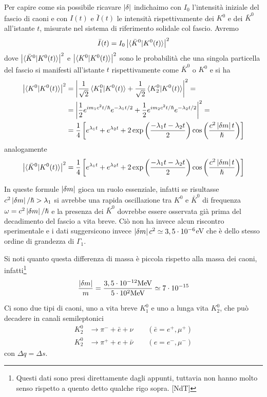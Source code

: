 Per capire come sia possibile ricavare $\left| \delta \right|$ indichaimo con $I_0$
l'intensità iniziale del fascio di caoni e con $I(t)$ e $\bar{I}(t)$ le
intensità rispettivamente dei $K^0$ e dei $\bar{K}^0$ all'istante $t$, misurate
nel sistema di riferimento solidale col fascio. Avremo
\[
  \bar{I}(t) = I_0\left| \braket{\bar{K}^0|K^0(t)} \right|^2
\]
dove $\left| \braket{\bar{K}^0|K^0(t)} \right|^2$ e $\left| \braket{K^0|K^0(t)} \right|^2
$ sono le probabilità che una singola particella del fascio si manifesti
all'istante $t$ rispettivamente come $\bar{K}^0$ o $K^0$ e si ha
\[
  \begin{split}
	\left| \braket{K^0|K^0(t)} \right|^2 &= \left| \frac{1}{\sqrt{2}}\braket{K_1^0|K^0(t)}
	+ \frac{1}{\sqrt{2}}\braket{K_2^0|K^0(t)} \right|^2=\\
	&= \left| \frac{1}{2}e^{im_1c^2t/\hslash}e^{-\lambda_1t/2} +
	\frac{1}{2}e^{im_2c^2t/\hslash}e^{-\lambda_2t/2} \right|^2=\\
    &=\frac{1}{4}\left[ e^{\lambda_1t} + e^{\lambda_2t} + 2\exp\left(
	  \frac{-\lambda_1t - \lambda_2t}{2}
	\right)\cos\left( \frac{c^2\left| \delta m \right|t}{\hslash} \right)\right]
  \end{split}
\]
analogamente
\[
  \left| \braket{\bar{K}^0|K^0(t)} \right|^2=\frac{1}{4}\left[ e^{\lambda_1t} + e^{\lambda_2t} + 2\exp\left(
  \frac{-\lambda_1t - \lambda_2t}{2}
  \right)\cos\left( \frac{c^2\left| \delta m \right|t}{\hslash} \right)\right]
\]

In queste formule $\left| \delta m \right|$ gioca un ruolo essenziale, infatti se
risultasse $c^2\left| \delta m \right|/\hslash > \lambda_1$ si avrebbe una rapida
oscillazione tra $K^0$ e $\bar{K}^0$ di frequenza $\omega = c^2\left| \delta
m \right|/\hslash$ e la presenza dei $\bar{K}^0$ dovrebbe essere osservata già prima
del decadimento del fascio a vita breve. Ciò non ha invece alcun riscontro
sperimentale e i dati suggersicono invece $\left| \delta m \right| c^2
\simeq3,5\cdot10^{-6}$eV che è dello stesso ordine di grandezza di $\Gamma_1$.

Si noti quanto questa differenza di massa è piccola rispetto alla massa dei
caoni, infatti\footnote{Questi dati sono presi direttamente dagli appunti,
  tuttavia non hanno molto senso rispetto a quento detto qualche rigo sopra.
[NdT]}
\[
  \frac{\left| \delta m \right|}{m} =
  \frac{3,5\cdot10^{-12}\text{MeV}}{5\cdot10^2\text{MeV}}\simeq
  7\cdot10^{-15}
\]

\breaknote

Ci sono due tipi di caoni, uno a vita breve $K_1^0$ e uno a lunga vita $K_2^0$,
che può decadere in canali semileptonici
\[
  \begin{split}
	K_2^0 &\rightarrow \pi^- + \bar{e} + \nu\qquad (\bar{e}=e^+,\mu^+)\\
    K_2^0 &\rightarrow \pi^+ + e + \bar{\nu} \qquad (e = e^-,\mu^-)
  \end{split}
\]
con $\Delta q= \Delta s$.

